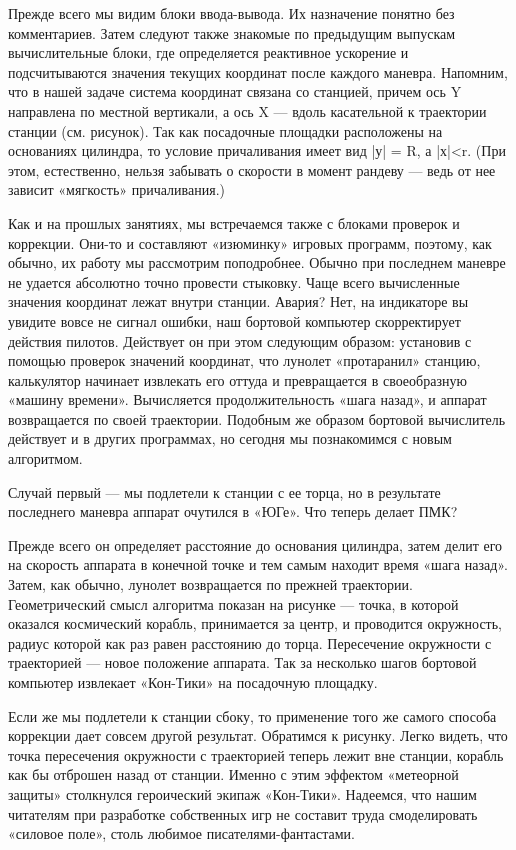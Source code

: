 \documentclass[11pt,a4paper,oneside]{article}
\begin{document}
Прежде всего мы видим блоки ввода-вывода. Их назначение понятно без комментариев. Затем следуют также знакомые по предыдущим выпускам вычислительные блоки, где определяется реактивное ускорение и подсчитываются значения текущих координат после каждого маневра. Напомним, что в нашей задаче система координат связана со станцией, причем ось Y направлена по местной вертикали, а ось X — вдоль касательной к траектории станции (см. рисунок). Так как посадочные площадки расположены на основаниях цилиндра, то условие причаливания имеет вид |у| = R, а |х|<r. (При этом, естественно, нельзя забывать о скорости в момент рандеву — ведь от нее зависит «мягкость» причаливания.)

Как и на прошлых занятиях, мы встречаемся также с блоками проверок и коррекции. Они-то и составляют «изюминку» игровых программ, поэтому, как обычно, их работу мы рассмотрим поподробнее. Обычно при последнем маневре не удается абсолютно точно провести стыковку. Чаще всего вычисленные значения координат лежат внутри станции. Авария? Нет, на индикаторе вы увидите вовсе не сигнал ошибки, наш бортовой компьютер скорректирует действия пилотов. Действует он при этом следующим образом: установив с помощью проверок значений координат, что лунолет «протаранил» станцию, калькулятор начинает извлекать его оттуда и превращается в своеобразную «машину времени». Вычисляется продолжительность «шага назад», и аппарат возвращается по своей траектории. Подобным же образом бортовой вычислитель действует и в других программах, но сегодня мы познакомимся с новым алгоритмом.

Случай первый — мы подлетели к станции с ее торца, но в результате последнего маневра аппарат очутился в «ЮГе». Что теперь делает ПМК?

Прежде всего он определяет расстояние до основания цилиндра, затем делит его на скорость аппарата в конечной точке и тем самым находит время «шага назад». Затем, как обычно, лунолет возвращается по прежней траектории. Геометрический смысл алгоритма показан на рисунке — точка, в которой оказался космический корабль, принимается за центр, и проводится окружность, радиус которой как раз равен расстоянию до торца. Пересечение окружности с траекторией — новое положение аппарата. Так за несколько шагов бортовой компьютер извлекает «Кон-Тики» на посадочную площадку.

Если же мы подлетели к станции сбоку, то применение того же самого способа коррекции дает совсем другой результат. Обратимся к рисунку. Легко видеть, что точка пересечения окружности с траекторией теперь лежит вне станции, корабль как бы отброшен назад от станции. Именно с этим эффектом «метеорной защиты» столкнулся героический экипаж «Кон-Тики». Надеемся, что нашим читателям при разработке собственных игр не составит труда смоделировать «силовое поле», столь любимое писателями-фантастами.
\end{document}

